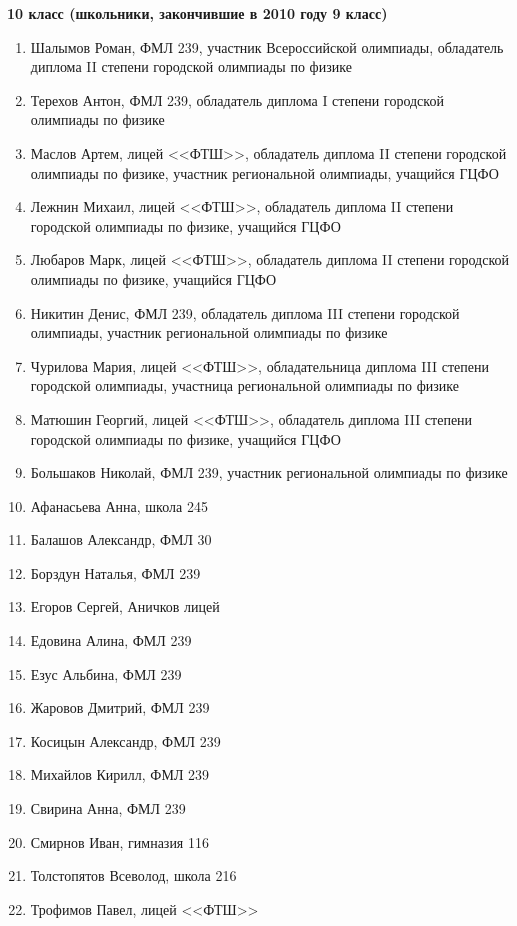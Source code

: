 \textbf{10 класс (школьники, закончившие в 2010 году 9 класс)}
\begin{enumerate}
\item Шалымов Роман, ФМЛ 239, участник Всероссийской олимпиады, обладатель диплома II степени городской олимпиады по физике
\item Терехов Антон, ФМЛ 239, обладатель диплома I степени городской олимпиады по физике
\item Маслов Артем, лицей <<ФТШ>>, обладатель диплома II степени
  городской олимпиады по физике, участник региональной олимпиады,
  учащийся ГЦФО
\item Лежнин Михаил, лицей <<ФТШ>>, обладатель диплома II степени
  городской олимпиады по физике, учащийся ГЦФО
\item Любаров Марк, лицей <<ФТШ>>, обладатель диплома II степени
  городской олимпиады по физике, учащийся ГЦФО
\item Никитин Денис, ФМЛ 239, обладатель диплома III степени городской олимпиады, участник региональной олимпиады по физике
\item Чурилова Мария, лицей <<ФТШ>>, обладательница диплома III степени городской олимпиады, участница региональной олимпиады по физике
\item Матюшин Георгий, лицей <<ФТШ>>, обладатель диплома III степени
  городской олимпиады по физике, учащийся ГЦФО
\item Большаков Николай, ФМЛ 239, участник региональной олимпиады по физике
\item Афанасьева Анна, школа 245
\item Балашов Александр, ФМЛ 30
\item Борздун Наталья, ФМЛ 239
\item Егоров Сергей, Аничков лицей
\item Едовина Алина, ФМЛ 239
\item Езус Альбина, ФМЛ 239
\item Жаровов Дмитрий, ФМЛ 239
\item Косицын Александр, ФМЛ 239
\item Михайлов Кирилл, ФМЛ 239
\item Свирина Анна, ФМЛ 239
\item Смирнов Иван, гимназия 116
\item Толстопятов Всеволод, школа 216
\item Трофимов Павел, лицей <<ФТШ>>
\end{enumerate}
